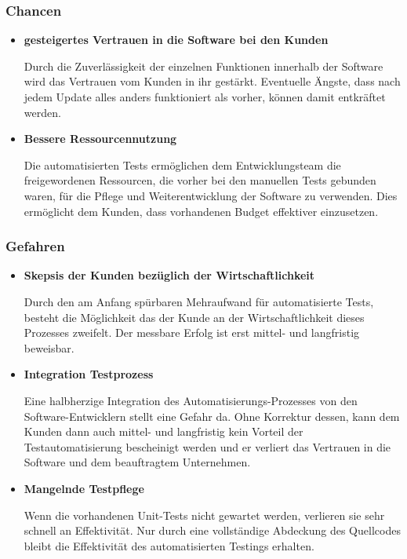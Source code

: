 \subsubsection{Chancen}
\begin{itemize}	
	\item \textbf{gesteigertes Vertrauen in die Software bei den Kunden}
	
	Durch die Zuverlässigkeit der einzelnen Funktionen innerhalb der Software wird das Vertrauen vom Kunden in ihr gestärkt. Eventuelle Ängste, dass nach jedem Update alles anders funktioniert als vorher, können damit entkräftet werden.
	
	\item \textbf{Bessere Ressourcennutzung}
	
	Die automatisierten Tests ermöglichen dem Entwicklungsteam die freigewordenen Ressourcen, die vorher bei den manuellen Tests gebunden waren, für die Pflege und Weiterentwicklung der Software zu verwenden. Dies ermöglicht dem Kunden, dass vorhandenen Budget effektiver einzusetzen.
	
\end{itemize}
	\subsubsection{Gefahren}
\begin{itemize}	
	\item \textbf{Skepsis der Kunden bezüglich der Wirtschaftlichkeit}
	
	Durch den am Anfang spürbaren Mehraufwand für automatisierte Tests, besteht die Möglichkeit das der Kunde an der Wirtschaftlichkeit dieses Prozesses zweifelt. Der messbare Erfolg ist erst mittel- und langfristig beweisbar.
	
	\item \textbf{Integration Testprozess}
	
	Eine halbherzige Integration des Automatisierungs-Prozesses von den Software-Entwicklern stellt eine Gefahr da. Ohne Korrektur dessen, kann dem Kunden dann auch mittel- und langfristig kein Vorteil der Testautomatisierung bescheinigt werden und er verliert das Vertrauen in die Software und dem beauftragtem Unternehmen.
	
	\item \textbf{Mangelnde Testpflege}
	
	Wenn die vorhandenen Unit-Tests nicht gewartet werden, verlieren sie sehr schnell an Effektivität. Nur durch eine vollständige Abdeckung des Quellcodes bleibt die Effektivität des automatisierten Testings erhalten.
	
	
\end{itemize}

